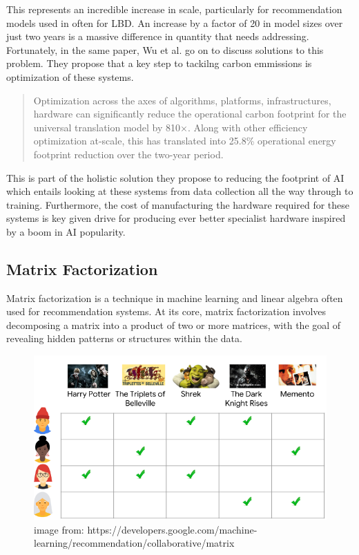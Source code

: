 \documentclass{l4proj}
\begin{document}
This represents an incredible increase in scale, particularly for recommendation models used in often for LBD. An increase by a factor of 20 in model sizes over just two years is a massive difference in quantity that needs addressing. Fortunately, in the same paper, Wu et al. go on to discuss solutions to this problem. They propose that a key step to tackilng carbon emmissions is optimization of these systems. \\

\begin{quote}
    Optimization across the axes of algorithms, platforms, infrastructures, hardware can significantly reduce the operational carbon footprint for the universal translation model by 810×. Along with other efficiency optimization at-scale, this has translated into 25.8\% operational energy footprint reduction over the two-year period.\\
\end{quote}

This is part of the holistic solution they propose to reducing the footprint of AI which entails looking at these systems from data collection all the way through to training. Furthermore, the cost of manufacturing the hardware required for these systems is key given drive for producing ever better specialist hardware inspired by a boom in AI popularity.\\

\subsection{Matrix Factorization}

Matrix factorization is a technique in machine learning and linear algebra often used for recommendation systems. At its core, matrix factorization involves decomposing a matrix into a product of two or more matrices, with the goal of revealing hidden patterns or structures within the data. \\

\begin{figure}[h]
    \centering
    \includegraphics[width=\linewidth]{images/matrix_fact_example.png}
    \caption{image from: https://developers.google.com/machine-learning/recommendation/collaborative/matrix}
    \label{fig:matrix_fact_example}
\end{figure}
\end{document}
